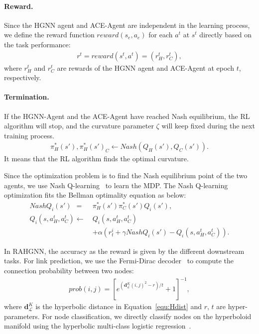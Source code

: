 \paragraph{Reward.} 
Since the HGNN agent and ACE-Agent are independent in the learning process, we define the reward function $reward(s_e, a_e)$ for each $a^t$ at $s^t$ directly based on the task performance:
\begin{equation}
\begin{aligned}
    r^t = reward\left(s^t, a^t\right)= (r^t_{H}, r^t_{C}), 
\end{aligned}
\end{equation}
where $r^t_{H}$ and $r^t_{C}$ are rewards of the HGNN agent and ACE-Agent at epoch $t$, respectively. 

\paragraph{Termination.} 
If the HGNN-Agent and the ACE-Agent have reached Nash equilibrium, the RL algorithm will stop, and the curvature parameter $\zeta$ will keep fixed during the next training process. 
\begin{equation}
\begin{aligned}
    \pi_{H}^*(s'), \pi_{H}^*(s')_{C} \gets Nash(Q_{H}(s'), Q_{C}(s')).
\end{aligned}
\end{equation}
It means that the RL algorithm finds the optimal curvature. 

Since the optimization problem is to find the Nash equilibrium point of the two agents, we use Nash Q-learning~\cite{hu2003nash} to learn the MDP. 
The Nash Q-learning optimization fits the Bellman optimality equation as below: 
\begin{equation}
\begin{aligned}
    NashQ_i(s') ~~=~~ & \pi_{H}^*(s') \pi_{C}^*(s') Q_i(s'),\\
    Q_i(s, a^t_{H}, a^t_{C}) \gets & Q_i(s, a^{t}_{H}, a^t_{C}) \\
    & + \alpha(r^i_t + \gamma NashQ_i(s') - Q_i(s, a^{t}_{H}, a^t_{C})). 
\end{aligned}
\end{equation}

In RAHGNN, the accuracy as the reward is given by the different downstream tasks. 
For link prediction, we use the Fermi-Dirac decoder~\cite{Krioukov2010Hyperbolic,NickelK17Poincare} to compute the connection probability between two nodes:
\begin{equation}
\begin{aligned}
    prob(i,j) = \left [ e^{ (\mathbf{d}^{K}_{\mathcal{L}}(i,j)^2 - r) / t} + 1 \right ]^{-1}, 
\end{aligned}
\end{equation}
where $\mathbf{d}^{K}_{\mathcal{L}}$ is the hyperbolic distance in Equation~\eqref{equ:Hdist} and $r$, $t$ are hyper-parameters.
For node classiﬁcation, we directly classify nodes on the hyperboloid manifold using the hyperbolic multi-class logistic regression~\cite{HNN:GaneaBH18}.


